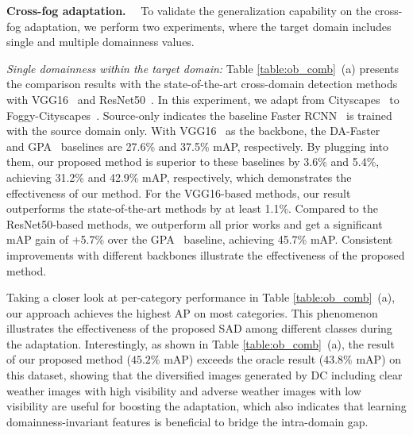 \documentclass[10pt,journal,compsoc]{IEEEtran}
\renewcommand{\paragraph}[1]{\noindent\textbf{#1}~~}
\begin{document}
\paragraph{Cross-fog adaptation.}
To validate the generalization capability on the cross-fog adaptation, we perform two experiments, where the target domain includes single and multiple domainness values.

\noindent  
\emph{Single domainness within the target domain:}
Table \ref{table:ob_comb}~(a) presents the comparison results with the state-of-the-art cross-domain detection methods with VGG16~\cite{vgg} and ResNet50~\cite{he2016deep}. In this experiment, we adapt from Cityscapes~\cite{cordts2016cityscapes} to Foggy-Cityscapes~\cite{FoggyCity}. Source-only indicates the baseline Faster RCNN~\cite{ren2015faster} is trained with the source domain only.  With VGG16~\cite{vgg} as the backbone, the DA-Faster~\cite{DA-Faster-RCNN} and GPA~\cite{GPA} baselines are 27.6\% and 37.5\% mAP, respectively. By plugging into them, our proposed method is superior to these baselines by 3.6\% and 5.4\%, achieving 31.2\% and 42.9\% mAP, respectively, which demonstrates the effectiveness of our method. 
For the VGG16-based methods, our result outperforms the state-of-the-art methods
by at least 1.1\%. Compared to the ResNet50-based methods, we outperform all prior works and get a significant mAP gain of +5.7\% over the GPA~\cite{GPA} baseline, achieving 45.7\% mAP.  Consistent improvements with different backbones illustrate
the effectiveness of the proposed method. 



Taking a closer look at per-category  performance in Table \ref{table:ob_comb}~(a), our approach achieves the highest AP on most categories.
This phenomenon illustrates the effectiveness of the proposed SAD among different classes during the adaptation. Interestingly, as shown in Table \ref{table:ob_comb}~(a), the result of our proposed method ($45.2\%$ mAP) exceeds the oracle result ($43.8\%$ mAP) on this dataset, showing that the diversified images generated by DC including clear weather images with high visibility and adverse weather images with low visibility are useful for boosting the adaptation, which also indicates that learning domainness-invariant features is beneficial to bridge the intra-domain gap.
\end{document}

